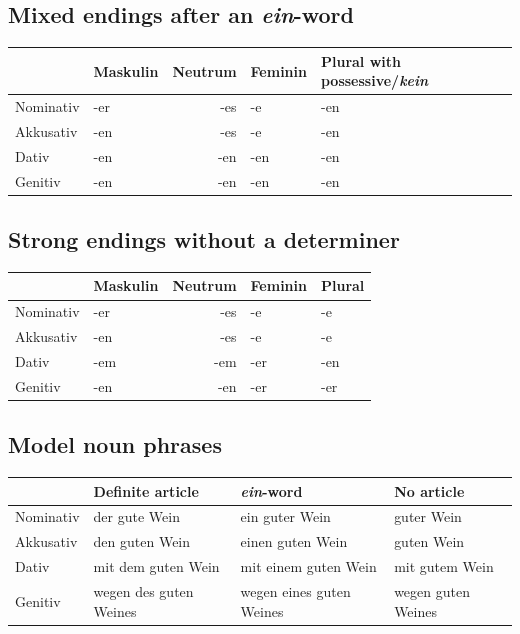 \subsection{Mixed endings after an \textit{ein}-word}

\begin{center}
\begin{tabular}{@{}lMNFP@{}}
\toprule
 & Maskulin & Neutrum & Feminin & Plural with possessive/\textit{kein} \\
\midrule
{}
Nominativ & -er & -es & -e & -en \\
Akkusativ & -en & -es & -e & -en \\
Dativ & -en & -en & -en & -en \\
Genitiv & -en & -en & -en & -en \\
\bottomrule
\end{tabular}
\end{center}

\subsection{Strong endings without a determiner}

\begin{center}
\begin{tabular}{@{}lMNFP@{}}
\toprule
 & Maskulin & Neutrum & Feminin & Plural \\
\midrule
{}
Nominativ & -er & -es & -e & -e \\
Akkusativ & -en & -es & -e & -e \\
Dativ & -em & -em & -er & -en \\
Genitiv & -en & -en & -er & -er \\
\bottomrule
\end{tabular}
\end{center}

\subsection{Model noun phrases}

\begin{center}
\begin{tabularx}{\textwidth}{@{}lXXX@{}}
\toprule
 & Definite article & \textit{ein}-word & No article \\
\midrule
\rowcolor{caseNominativeBg}
Nominativ & der gute Wein & ein guter Wein & guter Wein \\
\rowcolor{caseAccusativeBg}
Akkusativ & den guten Wein & einen guten Wein & guten Wein \\
\rowcolor{caseDativeBg}
Dativ & mit dem guten Wein & mit einem guten Wein & mit gutem Wein \\
\rowcolor{caseGenitiveBg}
Genitiv & wegen des guten Weines & wegen eines guten Weines & wegen guten Weines \\
\bottomrule
\end{tabularx}
\end{center}

